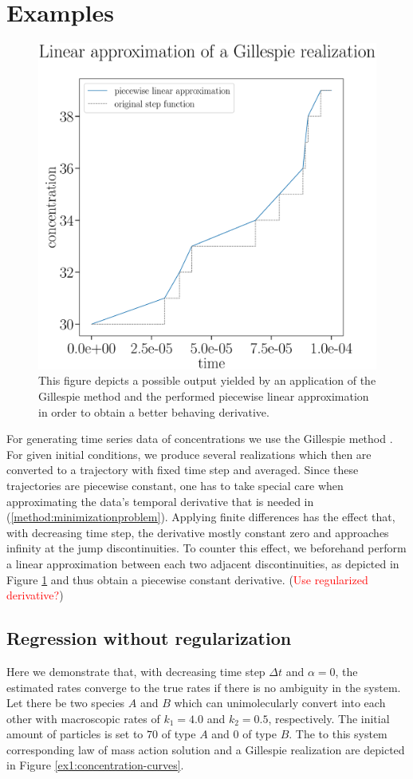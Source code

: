 \documentclass[oneside, abstracton, titlepage]{scrartcl}
\begin{document}
	\section{Examples}
	
	\begin{figure}
		\begin{center}
			\includegraphics[width=.5\textwidth]{./figures_tex/aux_linear_approximation.eps}
		\end{center}
		\caption{This figure depicts a possible output yielded by an application of the Gillespie method and the performed piecewise linear approximation in order to obtain a better behaving derivative.}
		\label{examples:linear-approximation}
	\end{figure}
	
	For generating time series data of concentrations we use the Gillespie method \cite{Gillespie1976}. For given initial conditions, we produce several realizations which then are converted to a trajectory with fixed time step and averaged. Since these trajectories are piecewise constant, one has to take special care when approximating the data's temporal derivative that is needed in (\ref{method:minimizationproblem}). Applying finite differences has the effect that, with decreasing time step, the derivative mostly constant zero and approaches infinity at the jump discontinuities. To counter this effect, we beforehand perform a linear approximation between each two adjacent discontinuities, as depicted in Figure \ref{examples:linear-approximation} and thus obtain a piecewise constant derivative. (\textcolor{red}{Use regularized derivative?})
	
	\subsection{Regression without regularization}
	\label{sec:ex1}
	
	Here we demonstrate that, with decreasing time step $\Delta t$ and $\alpha=0$, the estimated rates converge to the true rates if there is no ambiguity in the system. Let there be two species $A$ and $B$ which can unimolecularly convert into each other with macroscopic rates of $k_1=4.0$ and $k_2=0.5$, respectively. The initial amount of particles is set to $70$ of type $A$ and $0$ of type $B$. The to this system corresponding law of mass action solution and a Gillespie realization are  depicted in Figure \ref{ex1:concentration-curves}.
	
\end{document}
